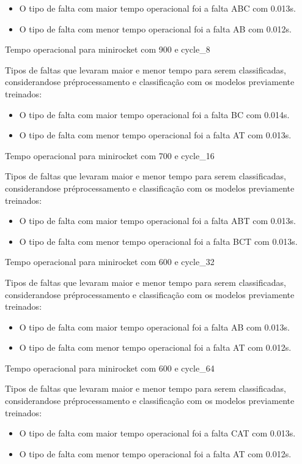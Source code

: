 \begin{itemize}
\item O tipo de falta com maior tempo operacional foi a falta ABC com 0.013s.
\item O tipo de falta com menor tempo operacional foi a falta AB com 0.012s.
\end{itemize}
Tempo operacional para minirocket com 900 e cycle_8
\item Tipos de faltas que levaram maior e menor tempo para serem classificadas, considerando\hyph se pré\hyph processamento e classificação com os modelos previamente treinados:
\begin{itemize}
\item O tipo de falta com maior tempo operacional foi a falta BC com 0.014s.
\item O tipo de falta com menor tempo operacional foi a falta AT com 0.013s.
\end{itemize}
Tempo operacional para minirocket com 700 e cycle_16
\item Tipos de faltas que levaram maior e menor tempo para serem classificadas, considerando\hyph se pré\hyph processamento e classificação com os modelos previamente treinados:
\begin{itemize}
\item O tipo de falta com maior tempo operacional foi a falta ABT com 0.013s.
\item O tipo de falta com menor tempo operacional foi a falta BCT com 0.013s.
\end{itemize}
Tempo operacional para minirocket com 600 e cycle_32
\item Tipos de faltas que levaram maior e menor tempo para serem classificadas, considerando\hyph se pré\hyph processamento e classificação com os modelos previamente treinados:
\begin{itemize}
\item O tipo de falta com maior tempo operacional foi a falta AB com 0.013s.
\item O tipo de falta com menor tempo operacional foi a falta AT com 0.012s.
\end{itemize}
Tempo operacional para minirocket com 600 e cycle_64
\item Tipos de faltas que levaram maior e menor tempo para serem classificadas, considerando\hyph se pré\hyph processamento e classificação com os modelos previamente treinados:
\begin{itemize}
\item O tipo de falta com maior tempo operacional foi a falta CAT com 0.013s.
\item O tipo de falta com menor tempo operacional foi a falta AT com 0.012s.
\end{itemize}
